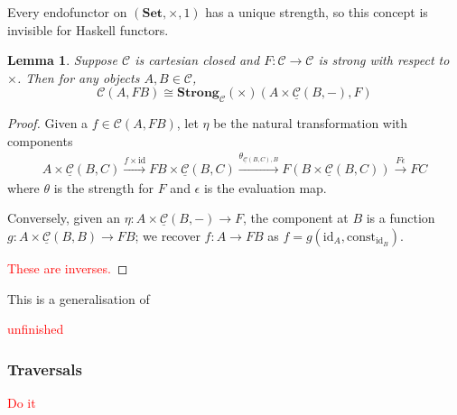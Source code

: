 \documentclass[11pt,a4paper]{article}
\theoremstyle{plain}
\newtheorem{lemma}[theorem]{Lemma}
\theoremstyle{definition}
\newcommand{\C}{\mathscr{C}}
\newcommand{\homC}{\underline{\C}}
\newcommand{\Set}{\mathbf{Set}}
\newcommand{\Strong}{\mathbf{Strong}}
\newcommand{\id}{\mathrm{id}}
\newcommand{\const}{\mathrm{const}}
\newcommand{\todo}[1]{\textcolor{red}{\small #1}}
\begin{document}
Every endofunctor on $(\Set, \times, 1)$ has a unique strength, so this concept is invisible for Haskell functors.

\begin{lemma}
Suppose $\C$ is cartesian closed and $F : \C \to \C$ is strong with respect to $\times$. Then for any objects $A, B \in \C$, \[\C(A, FB) \cong \Strong_\C(\times)(A \times \homC(B, -), F)\]
\end{lemma}
\begin{proof}
Given a $f \in \C(A, FB)$, let $\eta$ be the natural transformation with components
\begin{align*}
A \times \homC(B, C) \xrightarrow{f \times \id} FB \times \homC(B, C) \xrightarrow{\theta_{\homC(B, C), B}}  F(B \times \homC(B, C)) \xrightarrow{F\epsilon} FC
\end{align*}
where $\theta$ is the strength for $F$ and $\epsilon$ is the evaluation map.

Conversely, given an $\eta : A \times \homC(B, -) \to F$, the component at $B$ is a function $g : A \times \homC(B, B) \to FB$; we recover $f : A \to FB$ as $f = g (\id_A, \const_{\id_B})$.

\todo{These are inverses.}
\end{proof}

This is a generalisation of \cite[Proposition 2.2]{SecondOrderFunctionals}

\todo{unfinished}

\subsubsection{Traversals}
\todo{Do it}
\end{document}
